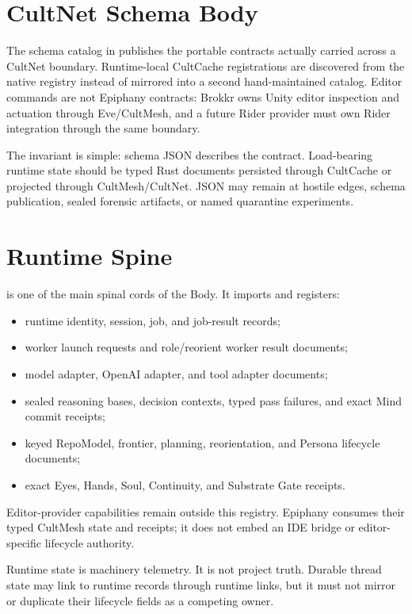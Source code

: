 \documentclass[11pt]{article}
\begin{document}
\section{CultNet Schema Body}

The schema catalog in  publishes the portable
contracts actually carried across a CultNet boundary. Runtime-local CultCache
registrations are discovered from the native registry instead of mirrored into
a second hand-maintained catalog. Editor commands are not Epiphany contracts:
Brokkr owns Unity editor inspection and actuation through Eve/CultMesh, and a
future Rider provider must own Rider integration through the same boundary.

The invariant is simple: schema JSON describes the contract. Load-bearing
runtime state should be typed Rust documents persisted through CultCache or
projected through CultMesh/CultNet. JSON may remain at hostile edges, schema
publication, sealed forensic artifacts, or named quarantine experiments.

\section{Runtime Spine}

 is one of the main spinal cords of
the Body. It imports and registers:

\begin{itemize}
  \item runtime identity, session, job, and job-result records;
  \item worker launch requests and role/reorient worker result documents;
  \item model adapter, OpenAI adapter, and tool adapter documents;
  \item sealed reasoning bases, decision contexts, typed pass failures, and
  exact Mind commit receipts;
  \item keyed RepoModel, frontier, planning, reorientation, and Persona
  lifecycle documents;
  \item exact Eyes, Hands, Soul, Continuity, and Substrate Gate receipts.
\end{itemize}

Editor-provider capabilities remain outside this registry. Epiphany consumes
their typed CultMesh state and receipts; it does not embed an IDE bridge or
editor-specific lifecycle authority.

Runtime state is machinery telemetry. It is not project truth. Durable thread
state may link to runtime records through runtime links, but it must not mirror
or duplicate their lifecycle fields as a competing owner.
\end{document}
